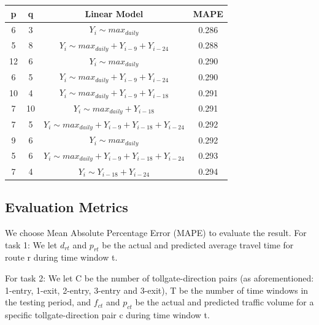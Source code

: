 \documentclass[journal, letterpaper]{IEEEtran}
\begin{document}
\begin{table}[ht]
\centering %
\begin{tabular}{c| c| c| c } %
\hline\hline %
p & q & Linear Model & MAPE \\ %
\hline %
6 & 3 & $Y_{i} \sim max_{daily}$ & 0.286 \\
\hline
5 & 8 & $Y_{i} \sim max_{daily} + Y_{i-9} + Y_{i-24}$ & 0.288  \\ %
\hline
12 & 6 & $Y_{i} \sim max_{daily}$ & 0.290 \\
\hline
6 & 5 & $Y_{i} \sim max_{daily} + Y_{i-9} + Y_{i-24}$ & 0.290 \\
\hline
10 & 4 & $Y_{i} \sim max_{daily} + Y_{i-9} + Y_{i-18}$ & 0.291  \\
\hline
7 & 10 & $Y_{i} \sim max_{daily} + Y_{i-18}$ & 0.291 \\
\hline
7 & 5 & $Y_{i} \sim max_{daily} + Y_{i-9} + Y_{i-18} + Y_{i-24}$ & 0.292 \\
\hline
9 & 6 & $Y_{i} \sim max_{daily}$ & 0.292 \\
\hline
5 & 6 & $Y_{i} \sim max_{daily} + Y_{i-9} + Y_{i-18} + Y_{i-24}$ & 0.293  \\
\hline
7 & 4 & $Y_{i} \sim Y_{i-18} + Y_{i-24}$ & 0.294 \\
\hline %
\end{tabular}
\label{table:nonlin} %
\end{table}

\subsection{Evaluation Metrics}

We choose Mean Absolute Percentage Error (MAPE) to evaluate the result. 
For task 1: We let $d_{rt}$ and $p_{rt}$ be the actual and predicted average travel time for route r during time window t. 

For task 2: We let C be the number of tollgate-direction pairs (as aforementioned: 1-entry, 1-exit, 2-entry, 3-entry and 3-exit), T be the number of time windows in the testing period, and $f_{ct}$ and $p_{ct}$ be the actual and predicted traffic volume for a specific tollgate-direction pair c during time window t. 
\end{document}
